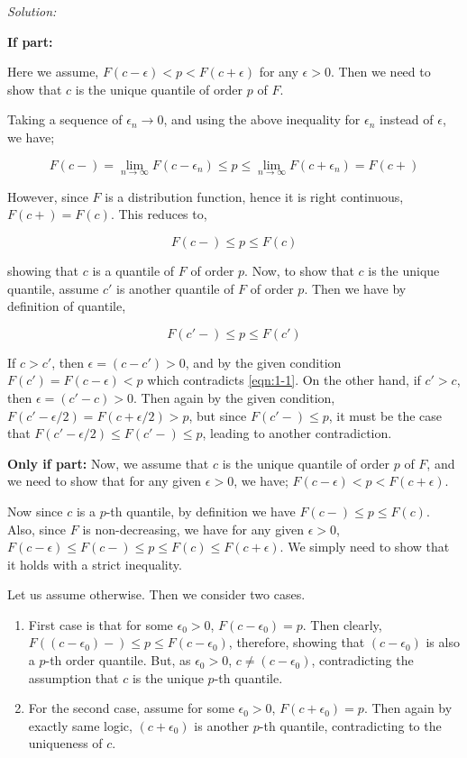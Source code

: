 \documentclass[12pt]{article}
\theoremstyle{definition}
\newenvironment{answer}{\textit{Solution: }\quad }{ \hfill \qedsymbol}
\begin{document}
\begin{answer}


	\textbf{If part:}

	Here we assume, $F(c - \epsilon) < p < F(c + \epsilon)$ for any $\epsilon > 0$. Then we need to show that $c$ is the unique quantile of order $p$ of $F$.

	Taking a sequence of $\epsilon_n \rightarrow 0$, and using the above inequality for $\epsilon_n$ instead of $\epsilon$, we have;

	$$F(c-) = \lim_{n \rightarrow \infty} F(c - \epsilon_n) \leq p \leq \lim_{n \rightarrow \infty} F(c + \epsilon_n) = F(c+)$$

	However, since $F$ is a distribution function, hence it is right continuous, $F(c+) = F(c)$. This reduces to,

	$$F(c-) \leq p \leq F(c)$$

	showing that $c$ is a quantile of $F$ of order $p$. Now, to show that $c$ is the unique quantile, assume $c'$ is another quantile of $F$ of order $p$. Then we have by definition of quantile,

	\begin{equation}
		F(c'-) \leq p \leq F(c')
		\label{eqn:1-1}
	\end{equation}

	If $c > c'$, then $\epsilon = (c - c') > 0$, and by the given condition $F(c') = F(c - \epsilon) < p$ which contradicts \eqref{eqn:1-1}. On the other hand, if $c' > c$, then $\epsilon = (c' - c) > 0$. Then again by the given condition, $F(c' - \epsilon/2) = F(c + \epsilon/2) > p$, but since $F(c'-) \leq p$, it must be the case that $F(c' - \epsilon/2) \leq F(c'-) \leq p$, leading to another contradiction.

	\textbf{Only if part:}
	Now, we assume that $c$ is the unique quantile of order $p$ of $F$, and we need to show that for any given $\epsilon > 0$, we have; $F(c - \epsilon) < p < F(c + \epsilon)$.

	Now since $c$ is a $p$-th quantile, by definition we have $F(c-) \leq p \leq F(c)$. Also, since $F$ is non-decreasing, we have for any given $\epsilon > 0$, $F(c-\epsilon) \leq F(c-) \leq p \leq F(c) \leq F(c+\epsilon)$. We simply need to show that it holds with a strict inequality.

	Let us assume otherwise. Then we consider two cases.

	\begin{enumerate}
		\item First case is that for some $\epsilon_0 > 0$, $F(c - \epsilon_0) = p$. Then clearly, $F((c - \epsilon_0) - ) \leq p \leq F(c - \epsilon_0)$, therefore, showing that $(c - \epsilon_0)$ is also a $p$-th order quantile. But, as $\epsilon_0 > 0$, $c \neq (c - \epsilon_0)$, contradicting the assumption that $c$ is the unique $p$-th quantile.
		\item For the second case, assume for some $\epsilon_0 > 0$, $F(c + \epsilon_0) = p$. Then again by exactly same logic, $(c + \epsilon_0)$ is another $p$-th quantile, contradicting to the uniqueness of $c$.
	\end{enumerate}


\end{answer}
\end{document}
